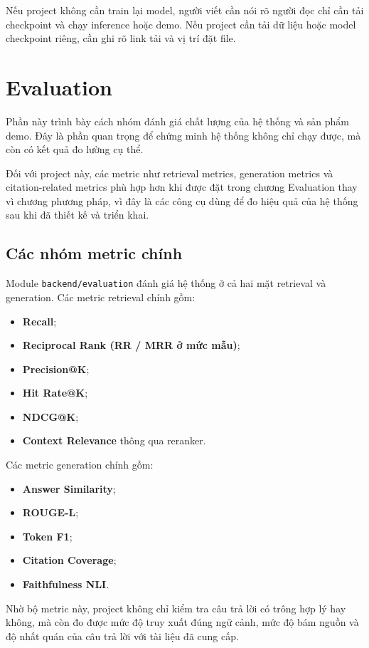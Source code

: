 \documentclass[12pt]{ai_conquer2026}
\begin{document}
Nếu project không cần train lại model, người viết cần nói rõ người đọc chỉ cần tải checkpoint và chạy inference hoặc demo. Nếu project cần tải dữ liệu hoặc model checkpoint riêng, cần ghi rõ link tải và vị trí đặt file.

\section{Evaluation}

Phần này trình bày cách nhóm đánh giá chất lượng của hệ thống và sản phẩm demo. Đây là phần quan trọng để chứng minh hệ thống không chỉ chạy được, mà còn có kết quả đo lường cụ thể.

Đối với project này, các metric như retrieval metrics, generation metrics và citation-related metrics phù hợp hơn khi được đặt trong chương Evaluation thay vì chương phương pháp, vì đây là các công cụ dùng để đo hiệu quả của hệ thống sau khi đã thiết kế và triển khai.

\subsection{Các nhóm metric chính}

Module \texttt{backend/evaluation} đánh giá hệ thống ở cả hai mặt retrieval và generation. Các metric retrieval chính gồm:
\begin{itemize}
    \item \textbf{Recall};
    \item \textbf{Reciprocal Rank (RR / MRR ở mức mẫu)};
    \item \textbf{Precision@K};
    \item \textbf{Hit Rate@K};
    \item \textbf{NDCG@K};
    \item \textbf{Context Relevance} thông qua reranker.
\end{itemize}

Các metric generation chính gồm:
\begin{itemize}
    \item \textbf{Answer Similarity};
    \item \textbf{ROUGE-L};
    \item \textbf{Token F1};
    \item \textbf{Citation Coverage};
    \item \textbf{Faithfulness NLI}.
\end{itemize}

Nhờ bộ metric này, project không chỉ kiểm tra câu trả lời có trông hợp lý hay không, mà còn đo được mức độ truy xuất đúng ngữ cảnh, mức độ bám nguồn và độ nhất quán của câu trả lời với tài liệu đã cung cấp.
\end{document}
